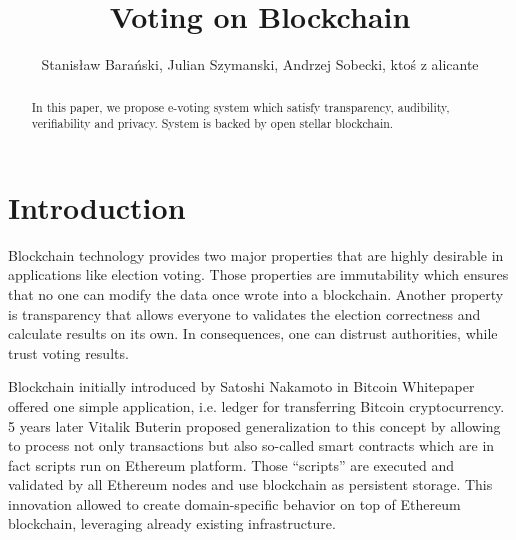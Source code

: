 \documentclass[runningheads]{llncs}
\begin{document}
%
\title{Voting on Blockchain}
%
%
\author{Stanisław Barański, Julian Szymanski, Andrzej Sobecki, ktoś z alicante}

%
%
\maketitle              %
%
\begin{abstract}
In this paper, we propose e-voting system which satisfy transparency, audibility, verifiability and privacy. System is backed by open stellar blockchain.


\end{abstract}


\section{Introduction}
 Blockchain technology provides two major properties that are highly desirable in applications like election voting. Those properties are immutability which ensures that no one can modify the data once wrote into a blockchain. Another property is transparency that allows everyone to validates the election correctness and calculate results on its own. In consequences, one can distrust authorities, while trust voting results. 

Blockchain initially introduced by Satoshi Nakamoto in Bitcoin Whitepaper offered one simple application, i.e. ledger for transferring Bitcoin cryptocurrency. 5 years later Vitalik Buterin proposed generalization to this concept by allowing to process not only transactions but also so-called smart contracts which are in fact scripts run on Ethereum platform. Those “scripts” are executed and validated by all Ethereum nodes and use blockchain as persistent storage. This innovation allowed to create domain-specific behavior on top of Ethereum blockchain, leveraging already existing infrastructure.
\end{document}

